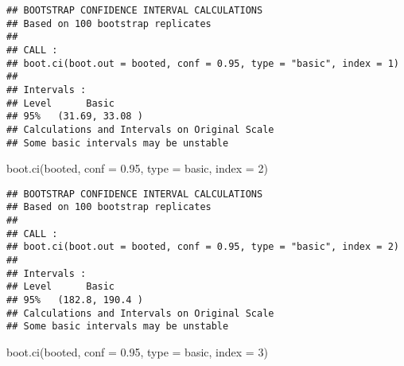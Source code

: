 \documentclass[
]{book}
\newenvironment{Shaded}{\begin{snugshade}}{\end{snugshade}}
\newcommand{\AttributeTok}[1]{\textcolor[rgb]{0.77,0.63,0.00}{#1}}
\newcommand{\ControlFlowTok}[1]{\textcolor[rgb]{0.13,0.29,0.53}{\textbf{#1}}}
\newcommand{\DecValTok}[1]{\textcolor[rgb]{0.00,0.00,0.81}{#1}}
\newcommand{\FloatTok}[1]{\textcolor[rgb]{0.00,0.00,0.81}{#1}}
\newcommand{\FunctionTok}[1]{\textcolor[rgb]{0.00,0.00,0.00}{#1}}
\newcommand{\NormalTok}[1]{#1}
\newcommand{\OtherTok}[1]{\textcolor[rgb]{0.56,0.35,0.01}{#1}}
\newcommand{\SpecialCharTok}[1]{\textcolor[rgb]{0.00,0.00,0.00}{#1}}
\newcommand{\StringTok}[1]{\textcolor[rgb]{0.31,0.60,0.02}{#1}}
\begin{document}
\begin{Shaded}
\end{Shaded}

\begin{verbatim}
## BOOTSTRAP CONFIDENCE INTERVAL CALCULATIONS
## Based on 100 bootstrap replicates
## 
## CALL : 
## boot.ci(boot.out = booted, conf = 0.95, type = "basic", index = 1)
## 
## Intervals : 
## Level      Basic         
## 95%   (31.69, 33.08 )  
## Calculations and Intervals on Original Scale
## Some basic intervals may be unstable
\end{verbatim}

\begin{Shaded}
\begin{Highlighting}[]
\FunctionTok{boot.ci}\NormalTok{(booted, }\AttributeTok{conf =} \FloatTok{0.95}\NormalTok{, }\AttributeTok{type =} \StringTok{\textquotesingle{}basic\textquotesingle{}}\NormalTok{, }\AttributeTok{index =} \DecValTok{2}\NormalTok{)}
\end{Highlighting}
\end{Shaded}

\begin{verbatim}
## BOOTSTRAP CONFIDENCE INTERVAL CALCULATIONS
## Based on 100 bootstrap replicates
## 
## CALL : 
## boot.ci(boot.out = booted, conf = 0.95, type = "basic", index = 2)
## 
## Intervals : 
## Level      Basic         
## 95%   (182.8, 190.4 )  
## Calculations and Intervals on Original Scale
## Some basic intervals may be unstable
\end{verbatim}

\begin{Shaded}
\begin{Highlighting}[]
\FunctionTok{boot.ci}\NormalTok{(booted, }\AttributeTok{conf =} \FloatTok{0.95}\NormalTok{, }\AttributeTok{type =} \StringTok{\textquotesingle{}basic\textquotesingle{}}\NormalTok{, }\AttributeTok{index =} \DecValTok{3}\NormalTok{)}
\end{Highlighting}
\end{Shaded}
\end{document}
